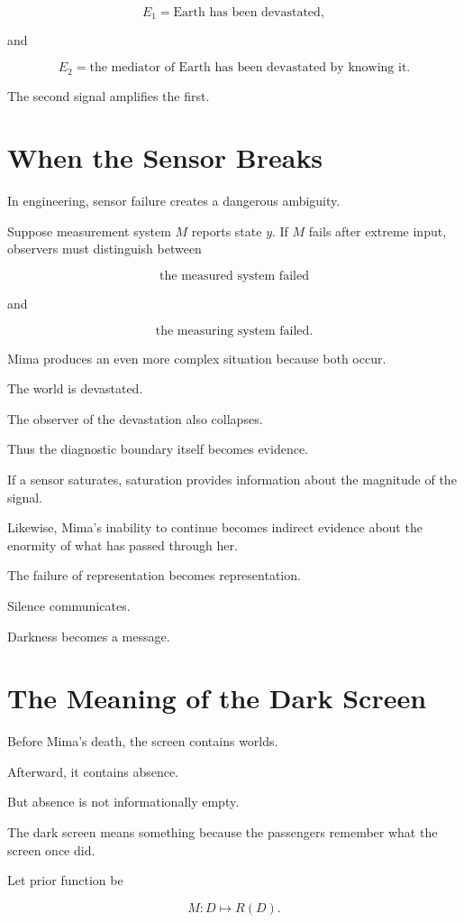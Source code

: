 \documentclass[11pt,oneside]{book}
\theoremstyle{definition}
\theoremstyle{remark}
\begin{document}
\[
E_1
=
\text{Earth has been devastated},
\]

and

\[
E_2
=
\text{the mediator of Earth has been devastated by knowing it}.
\]

The second signal amplifies the first.

\section{When the Sensor Breaks}

In engineering, sensor failure creates a dangerous ambiguity.

Suppose measurement system \(M\) reports state \(y\). If \(M\) fails after extreme input, observers must distinguish between

\[
\text{the measured system failed}
\]

and

\[
\text{the measuring system failed}.
\]

Mima produces an even more complex situation because both occur.

The world is devastated.

The observer of the devastation also collapses.

Thus the diagnostic boundary itself becomes evidence.

If a sensor saturates, saturation provides information about the magnitude of the signal.

Likewise, Mima's inability to continue becomes indirect evidence about the enormity of what has passed through her.

The failure of representation becomes representation.

Silence communicates.

Darkness becomes a message.

\section{The Meaning of the Dark Screen}

Before Mima's death, the screen contains worlds.

Afterward, it contains absence.

But absence is not informationally empty.

The dark screen means something because the passengers remember what the screen once did.

Let prior function be

\[
M:D\mapsto R(D).
\]
\end{document}
